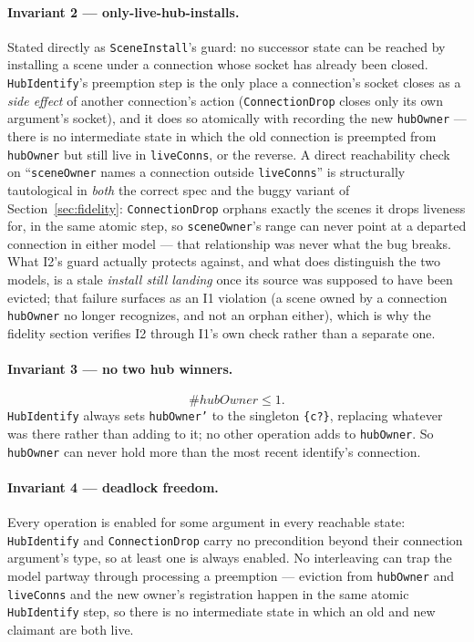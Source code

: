 \documentclass[a4paper,10pt,fleqn]{article}
\begin{document}
\paragraph{Invariant 2 --- only-live-hub-installs.}
Stated directly as \texttt{SceneInstall}'s guard: no successor state can
be reached by installing a scene under a connection whose socket has
already been closed.  \texttt{HubIdentify}'s preemption step is the only
place a connection's socket closes as a \emph{side effect} of another
connection's action (\texttt{ConnectionDrop} closes only its own
argument's socket), and it does so atomically with recording the new
\texttt{hubOwner} --- there is no intermediate state in which the old
connection is preempted from \texttt{hubOwner} but still live in
\texttt{liveConns}, or the reverse.  A direct reachability check on
``\texttt{sceneOwner} names a connection outside \texttt{liveConns}'' is
structurally tautological in \emph{both} the correct spec and the buggy
variant of Section~\ref{sec:fidelity}: \texttt{ConnectionDrop} orphans
exactly the scenes it drops liveness for, in the same atomic step, so
\texttt{sceneOwner}'s range can never point at a departed connection in
either model --- that relationship was never what the bug breaks.  What
I2's guard actually protects against, and what does distinguish the two
models, is a stale \emph{install still landing} once its source was
supposed to have been evicted; that failure surfaces as an I1 violation
(a scene owned by a connection \texttt{hubOwner} no longer recognizes,
and not an orphan either), which is why the fidelity section verifies I2
through I1's own check rather than a separate one.

\paragraph{Invariant 3 --- no two hub winners.}
\[
  \# hubOwner \leq 1.
\]
\texttt{HubIdentify} always sets \texttt{hubOwner'} to the singleton
\texttt{\{c?\}}, replacing whatever was there rather than adding to it; no
other operation adds to \texttt{hubOwner}.  So \texttt{hubOwner} can never
hold more than the most recent identify's connection.

\paragraph{Invariant 4 --- deadlock freedom.}
Every operation is enabled for some argument in every reachable state:
\texttt{HubIdentify} and \texttt{ConnectionDrop} carry no precondition
beyond their connection argument's type, so at least one is always
enabled.  No interleaving can trap the model partway through processing a
preemption --- eviction from \texttt{hubOwner} and \texttt{liveConns} and
the new owner's registration happen in the same atomic
\texttt{HubIdentify} step, so there is no intermediate state in which an
old and new claimant are both live.
\end{document}
